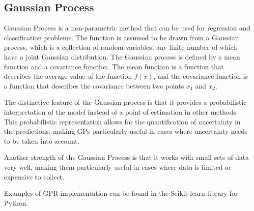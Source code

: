 \documentclass[aps,prb,twocolumn,superscriptaddress,floatfix]{revtex4-2}
\newcounter{para}
\begin{document}
\subsection{Gaussian Process}
Gaussian Process is a non-parametric method that can be used for regression and classification problems. The function is assumed to be drawn from a Gaussian process, which is a collection of random variables, any finite number of which have a joint Gaussian distribution. The Gaussian process is defined by a mean function and a covariance function. The mean function is a function that describes the average value of the function $f(x)$, and the covariance function is a function that describes the covariance between two points $x_1$ and $x_2$\cite{perger2021auto}\cite{RePEc:eee:transb:v:146:y:2021:i:c:p:88-110}.

The distinctive feature of the Gaussian process is that it provides a probabilistic interpretation of the model instead of a point of estimation in other methods. This probabilistic representation allows for the quantification of uncertainty in the predictions, making GPs particularly useful in cases where uncertainty needs to be taken into account.

Another strength of the Gaussian Process is that it works with small sets of data very well, making them particularly useful in cases where data is limited or expensive to collect.

Examples of GPR implementation can be found in the Scikit-learn library for Python\cite{pedregosa2011scikit}.
\end{document}
